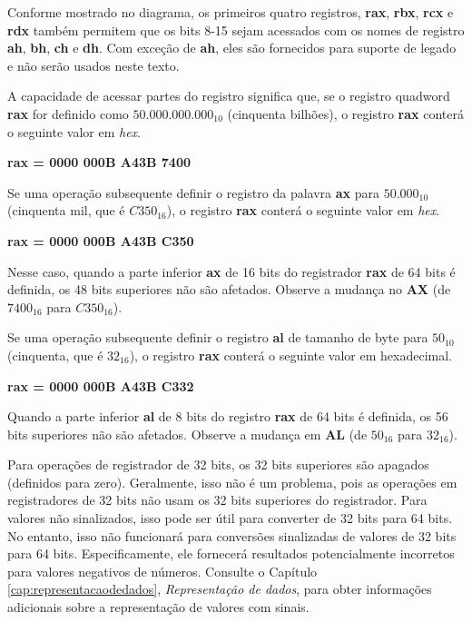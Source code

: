 Conforme mostrado no diagrama, os primeiros quatro registros, \textbf{rax}, \textbf{rbx}, \textbf{rcx} e \textbf{rdx} também permitem que os bits 8-15 sejam acessados com os nomes de registro \textbf{ah}, \textbf{bh}, \textbf{ch} e \textbf{dh}. Com exceção de \textbf{ah}, eles são fornecidos para suporte de legado e não serão usados neste texto.

A capacidade de acessar partes do registro significa que, se o registro quadword \textbf{rax}  for definido como $ 50.000.000.000_{10} $ (cinquenta bilhões), o registro \textbf{rax} conterá o seguinte valor em \textit{hex}.

\begin{center}
	\textbf{rax = 0000 000B A43B 7400}
\end{center}

Se uma operação subsequente definir o registro da palavra \textbf{ax} para $ 50.000_{10} $ (cinquenta mil, que é $ C350_{16} $), o registro \textbf{rax} conterá o seguinte valor em \textit{hex}.

\begin{center}
	\textbf{rax = 0000 000B A43B C350}
\end{center}

Nesse caso, quando a parte inferior \textbf{ax} de 16 bits do registrador \textbf{rax} de 64 bits é definida, os 48 bits superiores não são afetados. Observe a mudança no \textbf{AX} (de $ 7400_{16} $ para $ C350_{16} $).

Se uma operação subsequente definir o registro \textbf{al} de tamanho de byte para $ 50_{10} $ (cinquenta, que é $ 32_{16} $), o registro \textbf{rax} conterá o seguinte valor em hexadecimal.

\begin{center}
	\textbf{rax = 0000 000B A43B C332}
\end{center}

Quando a parte inferior \textbf{al} de 8 bits do registro \textbf{rax} de 64 bits é definida, os 56 bits superiores não são afetados. Observe a mudança em \textbf{AL} (de $ 50_{16} $ para $ 32_{16}$).

Para operações de registrador de 32 bits, os 32 bits superiores são apagados (definidos para zero). Geralmente, isso não é um problema, pois as operações em registradores de 32 bits não usam os 32 bits superiores do registrador. Para valores não sinalizados, isso pode ser útil para converter de 32 bits para 64 bits.
No entanto, isso não funcionará para conversões sinalizadas de valores de 32 bits para 64 bits.
Especificamente, ele fornecerá resultados potencialmente incorretos para valores negativos de números.
Consulte o Capítulo \ref{cap:representacaodedados}, \textit{Representação de dados}, para obter informações adicionais sobre a representação de valores com sinais.

